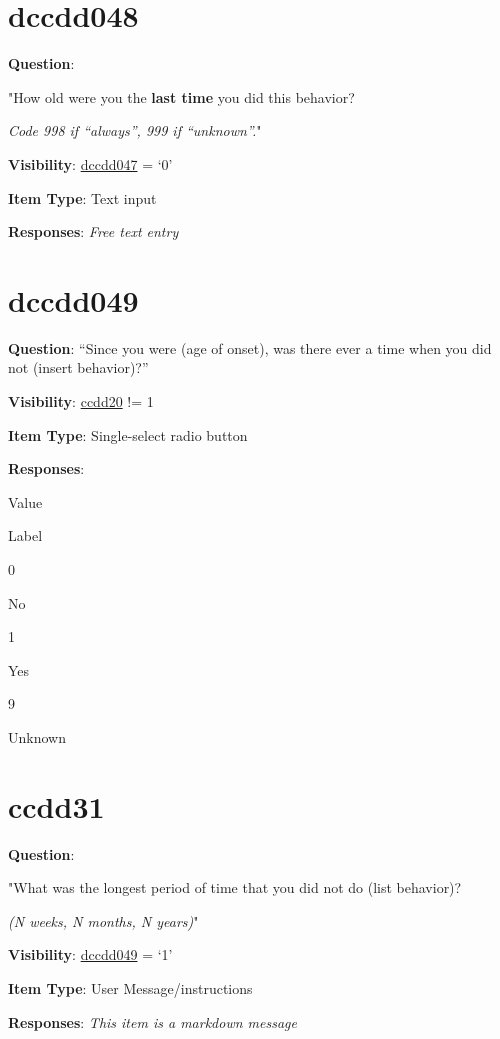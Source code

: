 \documentclass[]{book}
\begin{document}
\hypertarget{dccdd048}{%
\section{dccdd048}\label{dccdd048}}

\textbf{Question}:

"How old were you the \textbf{last time} you did this behavior?

\emph{Code 998 if ``always'', 999 if ``unknown''.}"

\textbf{Visibility}: \protect\hyperlink{dccdd047}{dccdd047} = `0'

\textbf{Item Type}: Text input

\textbf{Responses}: \emph{Free text entry}

\hypertarget{dccdd049}{%
\section{dccdd049}\label{dccdd049}}

\textbf{Question}: ``Since you were (age of onset), was there ever a time when you did not (insert behavior)?''

\textbf{Visibility}: \protect\hyperlink{ccdd20}{ccdd20} != 1

\textbf{Item Type}: Single-select radio button

\textbf{Responses}:

Value

Label

0

No

1

Yes

9

Unknown

\hypertarget{ccdd31}{%
\section{ccdd31}\label{ccdd31}}

\textbf{Question}:

"What was the longest period of time that you did not do (list behavior)?

\emph{(N weeks, N months, N years)}"

\textbf{Visibility}: \protect\hyperlink{dccdd049}{dccdd049} = `1'

\textbf{Item Type}: User Message/instructions

\textbf{Responses}: \emph{This item is a markdown message}
\end{document}
